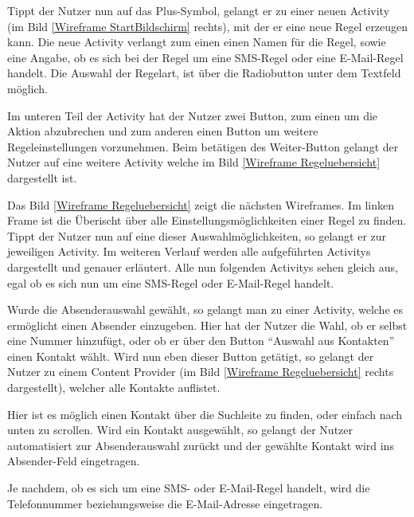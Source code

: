 Tippt der Nutzer nun auf das Plus-Symbol, gelangt er zu einer neuen Activity (im Bild \ref{Wireframe StartBildschirm} rechts), mit der er eine neue Regel erzeugen kann.
Die neue Activity verlangt zum einen einen Namen f\"ur die Regel, sowie eine Angabe, ob es sich bei der Regel um eine SMS-Regel oder eine E-Mail-Regel handelt. Die Auswahl der Regelart, ist \"uber die Radiobutton unter dem Textfeld m\"oglich.

Im unteren Teil der Activity hat der Nutzer zwei Button, zum einen um die Aktion abzubrechen und zum anderen einen Button um weitere Regeleinstellungen vorzunehmen.
Beim bet\"atigen des Weiter-Button gelangt der Nutzer auf eine weitere Activity welche im Bild \ref{Wireframe Regeluebersicht} dargestellt ist.

Das Bild \ref{Wireframe Regeluebersicht} zeigt die n\"achsten Wireframes. Im linken Frame ist die \"Uberischt \"uber alle Einstellungsm\"oglichkeiten einer Regel zu finden. Tippt der Nutzer nun auf eine dieser Auswahlm\"oglichkeiten, so gelangt er zur jeweiligen Activity. Im weiteren Verlauf werden alle aufgef\"uhrten Activitys dargestellt und genauer erl\"autert.
Alle nun folgenden Activitys sehen gleich aus, egal ob es sich nun um eine SMS-Regel oder E-Mail-Regel handelt.

Wurde die Absenderauswahl gew\"ahlt, so gelangt man zu einer Activity, welche es erm\"oglicht einen Absender einzugeben. Hier hat der Nutzer die Wahl, ob er selbst eine Nummer hinzuf\"ugt, oder ob er \"uber den Button "`Auswahl aus Kontakten"' einen Kontakt w\"ahlt. Wird nun eben dieser Button get\"atigt, so gelangt der Nutzer zu einem Content Provider (im Bild \ref{Wireframe Regeluebersicht} rechts dargestellt), welcher alle Kontakte auflistet. 

Hier ist es m\"oglich einen Kontakt \"uber die Suchleite zu finden, oder einfach nach unten zu scrollen. Wird ein Kontakt ausgew\"ahlt, so gelangt der Nutzer automatisiert zur Absenderauswahl zur\"uckt und der gew\"ahlte Kontakt wird ins Absender-Feld eingetragen.

Je nachdem, ob es sich um eine SMS- oder E-Mail-Regel handelt, wird die Telefonnummer beziehungsweise die E-Mail-Adresse eingetragen.

